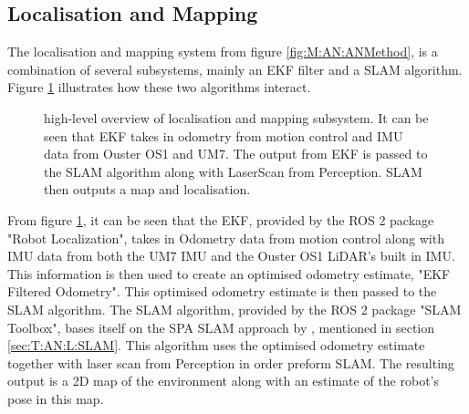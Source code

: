 

\subsection{Localisation and Mapping} \label{sec:M:AN:LocalisationAndMapping}
The localisation and mapping system from figure \ref{fig:M:AN:ANMethod}, is a combination of several subsystems, mainly an EKF filter and a SLAM algorithm. Figure \ref{fig:M:AN:LAM:LocMapping} illustrates how these two algorithms interact.

\begin{figure}[htp!]
    \fontsize{7}{14}\selectfont
    \centering
    
    \caption{high-level overview of localisation and mapping subsystem. It can be seen that EKF takes in odometry from motion control and IMU data from Ouster OS1 and UM7. The output from EKF is passed to the SLAM algorithm along with LaserScan from Perception. SLAM then outputs a map and localisation.}
    \label{fig:M:AN:LAM:LocMapping}
\end{figure}

From figure \ref{fig:M:AN:LAM:LocMapping}, it can be seen that the EKF, provided by the ROS 2 package "Robot Localization", takes in Odometry data from motion control along with IMU data from both the UM7 IMU and the Ouster OS1 LiDAR's built in IMU. This information is then used to create an optimised odometry estimate, "EKF Filtered Odometry". This optimised odometry estimate is then passed to the SLAM algorithm. The SLAM algorithm, provided by the ROS 2 package "SLAM Toolbox", bases itself on the SPA SLAM approach by \cite{Konolige2010}, mentioned in section \ref{sec:T:AN:L:SLAM}. This algorithm uses the optimised odometry estimate together with laser scan from Perception in order preform SLAM. The resulting output is a 2D map of the environment along with an estimate of the robot's pose in this map.

